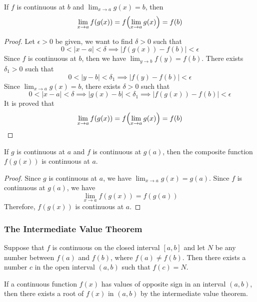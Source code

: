 \begin{theorem}
    If \(f\) is continuous at \(b\) and
    \(\displaystyle{\lim_{x\to a}g(x)=b}\), then
    \[\lim_{x\to a}f(g(x))=f\Bigl(\lim_{x\to a}g(x)\Bigr)=f(b)\]
\end{theorem}
\begin{proof}
    Let \(\epsilon>0\) be given, we want to find \(\delta>0\) such that
    \[0<|x-a|<\delta\implies|f(g(x))-f(b)|<\epsilon\]
    Since \(f\) is continuous at \(b\),
    then we have \(\lim_{y\to b}f(y)=f(b)\).
    There exists \(\delta_1>0\) such that
    \[0<|y-b|<\delta_1\implies|f(y)-f(b)|<\epsilon\]
    Since \(\lim_{x\to a}g(x)=b\), there exists \(\delta>0\) such that
    \[0<|x-a|<\delta\implies|g(x)-b|<\delta_1\implies|f(g(x))-f(b)|<\epsilon\]
    It is proved that
    \[\lim_{x\to a}f(g(x))=f\Bigl(\lim_{x\to a}g(x)\Bigr)=f(b)\]
\end{proof}
\begin{theorem}
    If \(g\) is continuous at \(a\) and \(f\) is continuous at \(g(a)\), then
    the composite function \(f(g(x))\) is continuous at \(a\).
\end{theorem}
\begin{proof}
    Since \(g\) is continuous at \(a\), we have \(\lim_{x\to a}g(x)=g(a)\).
    Since \(f\) is continuous at \(g(a)\), we have
    \[\lim_{x\to a}f(g(x))=f(g(a))\]
    Therefore, \(f(g(x))\) is continuous at \(a\).
\end{proof}

\subsubsection*{The Intermediate Value Theorem}
\begin{theorem}
    Suppose that \(f\) is continuous on the closed interval \([a,b]\) and let
    \(N\) be any number between \(f(a)\) and \(f(b)\),
    where \(f(a)\neq f(b)\).
    Then there exists a number \(c\) in the open interval \((a,b)\) such that
    \(f(c)=N\).
\end{theorem}
If a continuous function \(f(x)\) has values of opposite sign in an interval
\((a,b)\), then there exists a root of \(f(x)\) in \((a,b)\) by the
intermediate value theorem.